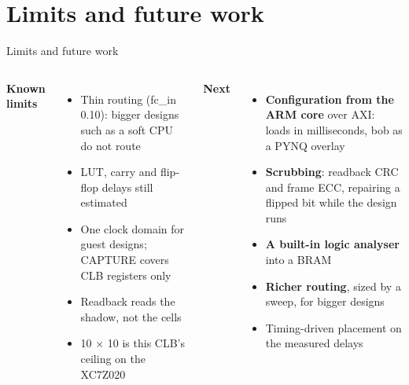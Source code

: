 \documentclass[aspectratio=169,11pt]{beamer}
\begin{document}
\section{Limits and future work}
\begin{frame}{Limits and future work}
  \begin{columns}[T]
    \textbf{Known limits}
    \small
    \begin{itemize}
      \item Thin routing (fc\_in 0.10): bigger designs such as a soft CPU do not route
      \item LUT, carry and flip-flop delays still estimated
      \item One clock domain for guest designs; CAPTURE covers CLB registers only
      \item Readback reads the shadow, not the cells
      \item 10 $\times$ 10 is this CLB's ceiling on the XC7Z020
    \end{itemize}
    \textbf{Next}
    \small
    \begin{itemize}
      \item \textbf{Configuration from the ARM core} over AXI: loads in milliseconds, bob as a PYNQ overlay
      \item \textbf{Scrubbing}: readback CRC and frame ECC, repairing a flipped bit while the design runs
      \item \textbf{A built-in logic analyser} into a BRAM
      \item \textbf{Richer routing}, sized by a sweep, for bigger designs
      \item Timing-driven placement on the measured delays
    \end{itemize}
  \end{columns}
\end{frame}
\end{document}
